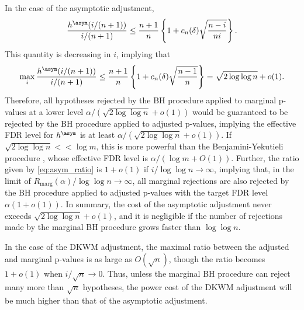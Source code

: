 In the case of the asymptotic adjustment,
\begin{equation}\label{eq:asym_ratio}
\frac{h^\asym (i/(n+1))}{i/(n+1)} \le \frac{n+1}{n}\left\{1 + c_{n}(\delta)\sqrt{\frac{n - i}{ni}}\right\}.
\end{equation}
This quantity is decreasing in $i$, implying that
 \[\max_{i}\frac{h^\asym (i/(n+1))}{i/(n+1)}\le \frac{n+1}{n}\left\{1 + c_{n}(\delta)\sqrt{\frac{n - 1}{n}}\right\}= \sqrt{2\log \log n} + o(1).\]
Therefore, all hypotheses rejected by the BH procedure applied to marginal p-values at a lower level $\alpha / (\sqrt{2\log \log n} + o(1))$ would be guaranteed to be rejected by the BH procedure applied to adjusted p-values, implying the effective FDR level for $h^\asym$ is at least $\alpha / (\sqrt{2\log\log n} + o(1))$. If $\sqrt{2\log \log n} <\!\!< \log m$, this is more powerful than the Benjamini-Yekutieli procedure \citep{benjamini2001control}, whose effective FDR level is $\alpha / (\log m + O(1))$. Further, the ratio given by \eqref{eq:asym_ratio} is $1 + o(1)$ if $i / \log \log n \rightarrow \infty$, implying that, in the limit of $R_{\mathrm{marg}}(\alpha) / \log \log n\rightarrow \infty$, all marginal rejections are also rejected by the BH procedure applied to adjusted p-values with the target FDR level $\alpha(1 + o(1))$. In summary, the cost of the asymptotic adjustment never exceeds $\sqrt{2\log \log n} + o(1)$, and it is negligible if the number of rejections made by the marginal BH procedure grows faster than $\log \log n$.

In the case of the DKWM adjustment, the maximal ratio between the adjusted and marginal p-values is as large as $O(\sqrt{n})$, though the ratio becomes $1 + o(1)$ when $i / \sqrt{n}\rightarrow 0$. Thus, unless the marginal BH procedure can reject many more than $\sqrt{n}$ hypotheses, the power cost of the DKWM adjustment will be much higher than that of the asymptotic adjustment.

